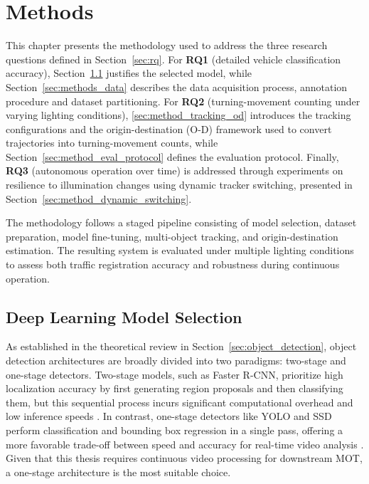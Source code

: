\chapter{Methods}
\label{chap:methods}
This chapter presents the methodology used to address the three research questions defined in Section~\ref{sec:rq}. For \textbf{RQ1} (detailed vehicle classification accuracy), Section~\ref{sec:methods_yolo} justifies the selected model, while Section~\ref{sec:methods_data} describes the data acquisition process, annotation procedure and dataset partitioning. For \textbf{RQ2} (turning-movement counting under varying lighting conditions), \autoref{sec:method_tracking_od} introduces the tracking configurations and the origin-destination (O-D) framework used to convert trajectories into turning-movement counts, while Section~\ref{sec:method_eval_protocol} defines the evaluation protocol. Finally, \textbf{RQ3} (autonomous operation over time) is addressed through experiments on resilience to illumination changes using dynamic tracker switching, presented in Section~\ref{sec:method_dynamic_switching}.

The methodology follows a staged pipeline consisting of model selection, dataset preparation, model fine-tuning, multi-object tracking, and origin-destination estimation. The resulting system is evaluated under multiple lighting conditions to assess both traffic registration accuracy and robustness during continuous operation.

\section{Deep Learning Model Selection}
\label{sec:methods_yolo}

As established in the theoretical review in Section~\ref{sec:object_detection}, object detection architectures are broadly divided into two paradigms: two-stage and one-stage detectors. Two-stage models, such as Faster R-CNN, prioritize high localization accuracy by first generating region proposals and then classifying them, but this sequential process incurs significant computational overhead and low inference speeds \citep{Ren2015, Zhao2019}. In contrast, one-stage detectors like YOLO and SSD perform classification and bounding box regression in a single pass, offering a more favorable trade-off between speed and accuracy for real-time video analysis \citep{Redmon2016, Liu2016}. Given that this thesis requires continuous video processing for downstream MOT, a one-stage architecture is the most suitable choice.

